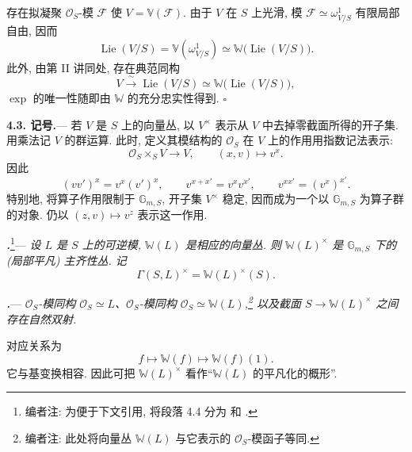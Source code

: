 存在拟凝聚 \(\mathcal O_S\)-模 \(\mathscr F\) 使 \(V=\mathbb V(\mathscr F)\). 由于 \(V\) 在 \(S\) 上光滑, 模 \(\mathscr F\simeq\omega^1_{V/S}\) 有限局部自由, 因而
\[
  \operatorname{Lie}(V/S)
  =
  \mathbb V(\omega^1_{V/S})
  \simeq
  \mathbb W\bigl(\operatorname{Lie}(V/S)\bigr).
\]
此外, 由第 II 讲同处, 存在典范同构
\[
  V
  \xrightarrow{\ \sim\ }
  \operatorname{Lie}(V/S)
  \simeq
  \mathbb W\bigl(\operatorname{Lie}(V/S)\bigr),
\]
\(\exp\) 的唯一性随即由 \(\mathbb W\) 的充分忠实性得到.
\hfill\(\square\)

\par\medskip\noindent
\textbf{4.3. 记号.}---
若 \(V\) 是 \(S\) 上的向量丛, 以 \(V^\times\) 表示从 \(V\) 中去掉零截面所得的开子集. 用乘法记 \(V\) 的群运算. 此时, 定义其模结构的 \(\mathcal O_S\) 在 \(V\) 上的作用用指数记法表示:
\[
  \mathcal O_S\times_S V\longrightarrow V,
  \qquad
  (x,v)\longmapsto v^x.
\]
因此
\[
  (vv')^x=v^x(v')^x,
  \qquad
  v^{x+x'}=v^xv^{x'},
  \qquad
  v^{xx'}=(v^x)^{x'}.
\]
特别地, 将算子作用限制于 \(\mathbb G_{m,S}\), 开子集 \(V^\times\) 稳定, 因而成为一个以 \(\mathbb G_{m,S}\) 为算子群的对象. 仍以 \((z,v)\longmapsto v^z\) 表示这一作用.

\par\medskip\noindent
{}\textbf{\textit{.}}\footnote{编者注: 为便于下文引用, 将段落 4.4 分为  和 .}---
\textit{设 \(L\) 是 \(S\) 上的可逆模, \(\mathbb W(L)\) 是相应的向量丛. 则 \(\mathbb W(L)^\times\) 是 \(\mathbb G_{m,S}\) 下的 \textup{(局部平凡)} 主齐性丛. 记}
\[
  \Gamma(S,L)^\times=\mathbb W(L)^\times(S).
\]

\par\medskip\noindent
{}\textbf{\textit{.}}---
\textit{\(\mathcal O_S\)-模同构 \(\mathcal O_S\simeq L\)、\(\mathcal O_S\)-模同构 \(\mathcal O_S\simeq\mathbb W(L)\),\footnote{编者注: 此处将向量丛 \(\mathbb W(L)\) 与它表示的 \(\mathcal O_S\)-模函子等同.} 以及截面 \(S\to\mathbb W(L)^\times\) 之间存在自然双射.}

对应关系为
\[
  f\longmapsto\mathbb W(f)\longmapsto\mathbb W(f)(1).
\]
它与基变换相容. 因此可把 \(\mathbb W(L)^\times\) 看作“\(\mathbb W(L)\) 的平凡化的概形”.

